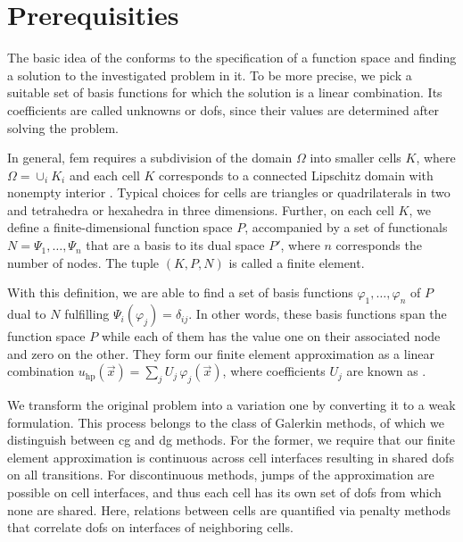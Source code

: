 \section{Prerequisities}
\label{sec:prerequisities}


The basic idea of the  conforms to the specification of a function space and finding a solution to the investigated problem in it. To be more precise, we pick a suitable set of basis functions for which the solution is a linear combination. Its coefficients are called unknowns or \glspl{dof}, since their values are determined after solving the problem.

In general, \gls{fem} requires a subdivision of the domain $\Omega$ into smaller cells $K$, where $\Omega = \cup_{i} K_i$ and each cell $K$ corresponds to a connected Lipschitz domain with nonempty interior . Typical choices for cells are triangles or quadrilaterals in two and tetrahedra or hexahedra in three dimensions.
Further, on each cell $K$, we define a finite-dimensional function space $P$, accompanied by a set of functionals $N = {\Psi_1, \dots, \Psi_n}$ that are a basis to its dual space $P'$, where $n$ corresponds the number of nodes. The tuple $(K,P,N)$ is called a finite element. 

With this definition, we are able to find a set of basis functions ${\varphi_1, \dots, \varphi_n}$ of $P$ dual to $N$ fulfilling $\Psi_i(\varphi_j) = \delta_{ij}$. In other words, these basis functions span the function space $P$ while each of them has the value one on their associated node and zero on the other. They form our finite element approximation as a linear combination $u_{\text{hp}}(\vec{x}) = \sum_{j} U_j \, \varphi_j(\vec{x})$, where coefficients $U_j$ are known as .

We transform the original problem into a variation one by converting it to a weak formulation. This process belongs to the class of Galerkin methods, of which we distinguish between \gls{cg} and \gls{dg} methods. For the former, we require that our finite element approximation is continuous across cell interfaces resulting in shared \glspl{dof} on all transitions. For discontinuous methods, jumps of the approximation are possible on cell interfaces, and thus each cell has its own set of \glspl{dof} from which none are shared. Here, relations between cells are quantified via penalty methods that correlate \glspl{dof} on interfaces of neighboring cells.

